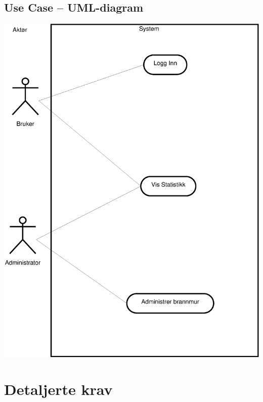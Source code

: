 \documentclass[nynorsk,12pt,a4paper]{article}
\begin{document}
\subsection{Use Case -- UML-diagram}
\includegraphics[scale=0.5]{gfx/UC.eps} 
\newpage
\section{Detaljerte krav}
\end{document}
